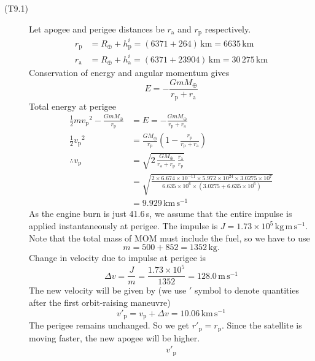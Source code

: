 \begin{description}
\item[(T9.1)]
Let apogee and perigee distances be $r_{\mathrm{a}}$ and $r_{\mathrm{p}}$
respectively.
\begin{align*}
r_{\mathrm{p}} &= R_\oplus + h^i_{\mathrm{p}} = (6371 + 264)\,\mathrm{km}
  = 6635\,\mathrm{km} \\
r_{\mathrm{a}} &= R_\oplus + h^i_{\mathrm{a}} = (6371 + 23904)\,\mathrm{km}
  = 30\,275\,\mathrm{km}
\end{align*}
Conservation of energy and angular momentum gives
\[ E = -\frac{GmM_\oplus}{r_{\mathrm{p}} + r_{\mathrm{a}}} \]
Total energy at perigee
\begin{align*}
\frac{1}{2}m{v_{\mathrm{p}}}^2 - \frac{GmM_\oplus}{r_{\mathrm{p}}}
  &= E = -\frac{GmM_\oplus}{r_{\mathrm{p}} + r_{\mathrm{a}}} \\
\frac{1}{2}{v_{\mathrm{p}}}^2
  &= \frac{GM_\oplus}{r_{\mathrm{p}}}
     \left(1 - \frac{r_{\mathrm{p}}}{r_{\mathrm{p}} + r_{\mathrm{a}}}\right) \\
\therefore v_{\mathrm{p}}
  &= \sqrt{2\,\frac{GM_\oplus}{r_{\mathrm{a}} + r_{\mathrm{p}}}\,
     \frac{r_{\mathrm{a}}}{r_{\mathrm{p}}}} \\
  &= \sqrt{\frac{2 \times 6.674 \times 10^{-11} \times 5.972 \times 10^{24}
     \times 3.0275 \times 10^{7}}
     {6.635 \times 10^{6} \times (3.0275 + 6.635 \times 10^{6})}} \\
  &= 9.929\,\mathrm{km\,s^{-1}}
\end{align*}
As the engine burn is just 41.6\,s, we assume that the entire impulse is
applied instantaneously at perigee. The impulse is
$J = 1.73 \times 10^{5}\,\mathrm{kg\,m\,s^{-1}}$. Note that the total mass of
MOM must include the fuel, so we have to use
\[ m = 500 + 852 = 1352\,\mathrm{kg}. \]
Change in velocity due to impulse at perigee is
\[ \Delta v = \frac{J}{m} = \frac{1.73 \times 10^{5}}{1352}
   = 128.0\,\mathrm{m\,s^{-1}} \]
The new velocity will be given by (we use $'$ symbol to denote quantities
after the first orbit-raising maneuvre)
\[ v'_{\mathrm{p}} = v_{\mathrm{p}} + \Delta v = 10.06\,\mathrm{km\,s^{-1}} \]
The perigee remains unchanged. So we get $r'_{\mathrm{p}} = r_{\mathrm{p}}$.
Since the satellite is moving faster, the new apogee will be higher.
\begin{align*}
v'_{\mathrm{p}}

\end{align*}
\end{description}
